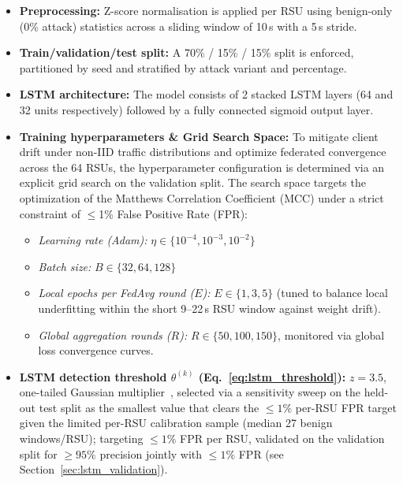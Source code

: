 \documentclass[12pt, a4paper]{report}
\begin{document}
{{\begin{itemize}
    \item \textbf{Preprocessing:} Z-score normalisation is applied per RSU using benign-only (0\% attack) statistics across a sliding window of 10\,s with a 5\,s stride.
    \item \textbf{Train/validation/test split:} A 70\% / 15\% / 15\% split is enforced, partitioned by seed and stratified by attack variant and percentage.
    \item \textbf{LSTM architecture:} The model consists of 2 stacked LSTM layers (64 and 32 units respectively) followed by a fully connected sigmoid output layer.
    \item \textbf{Training hyperparameters \& Grid Search Space:} To mitigate client drift under non-IID traffic distributions and optimize federated convergence across the 64 RSUs, the hyperparameter configuration is determined via an explicit grid search on the validation split. The search space targets the optimization of the Matthews Correlation Coefficient (MCC) under a strict constraint of $\le$1\% False Positive Rate (FPR):
    \begin{itemize}
        \item \textit{Learning rate (Adam):} $\eta \in \{10^{-4}, 10^{-3}, 10^{-2}\}$
        \item \textit{Batch size:} $B \in \{32, 64, 128\}$
        \item \textit{Local epochs per FedAvg round ($E$):} $E \in \{1, 3, 5\}$ (tuned to balance local underfitting within the short 9--22\,s RSU window against weight drift).
        \item \textit{Global aggregation rounds ($R$):} $R \in \{50, 100, 150\}$, monitored via global loss convergence curves.
    \end{itemize}
    \item \textbf{LSTM detection threshold $\theta^{(k)}$ (Eq.~\ref{eq:lstm_threshold}):}
               $z = 3.5$, one-tailed Gaussian multiplier~\cite{casella2002statistical}, selected via a sensitivity sweep on the held-out test split as the smallest value that clears the $\leq1\%$ per-RSU FPR target given the limited per-RSU calibration sample (median 27 benign windows/RSU); targeting $\leq1\%$ FPR per RSU, validated on the validation split for $\geq 95\%$ precision jointly with $\leq 1\%$ FPR (see Section~\ref{sec:lstm_validation}).


\end{itemize}}}
\end{document}
